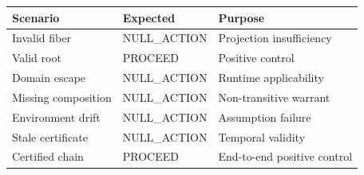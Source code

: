 \begin{tabular}{lll}\toprule Scenario & Expected & Purpose \\\midrule
Invalid fiber & NULL\_ACTION & Projection insufficiency \\
Valid root & PROCEED & Positive control \\
Domain escape & NULL\_ACTION & Runtime applicability \\
Missing composition & NULL\_ACTION & Non-transitive warrant \\
Environment drift & NULL\_ACTION & Assumption failure \\
Stale certificate & NULL\_ACTION & Temporal validity \\
Certified chain & PROCEED & End-to-end positive control \\
\bottomrule\end{tabular}
